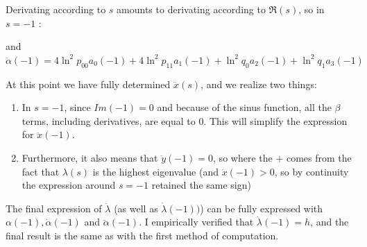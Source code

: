 \begin{appendices}
Derivating according to $s$ amounts to derivating according to $\Re(s)$, so in $s=-1$ :

\leftcenters
    {and}
    {$ \ddot{\alpha}(-1) = 4\ln^2 p_{0 0} a_0(-1)
                             + 4\ln^2 p_{1 1} a_1(-1)
                              +\ln^2 q_0 a_2(-1)
                              +\ln^2 q_1 a_3(-1) $}

At this point we have fully determined $\ddot{{x}}(s)$, and we realize two things:

\begin{enumerate}
    \item In $s=-1$, since $Im(-1) =0$ and because of the sinus function,
          all the $\beta$ terms, including derivatives, are equal to 0.
          This will simplify the expression for $\ddot{{x}}(-1)$. \\

    \item Furthermore, it also means that $\ddot{{y}}(-1) = 0$,
          so
          where the $+$ comes from the fact that $\lambda(s)$ is 
          the highest eigenvalue (and $\ddot{{x}}(-1) > 0$, so by
          continuity the expression around $s=-1$ retained the same sign)
\end{enumerate}

The final expression of $\ddot{{\lambda}}$ (as well as $\dot{\lambda}(-1))$)
can be fully expressed with $\alpha(-1), \dot{\alpha}(-1)$ and $\ddot{{\alpha}}(-1)$.
I empirically verified that $\dot{\lambda}(-1) = h$, and the final result is the same
as with the first method of computation.

\end{appendices}
 


